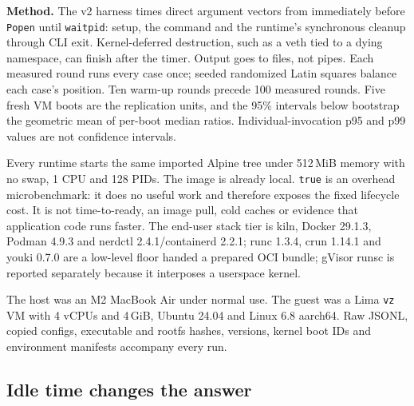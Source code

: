 \documentclass[10pt,letterpaper]{article}
\newcommand{\code}[1]{\texttt{#1}}
\begin{document}
\textbf{Method.} The v2 harness times direct argument vectors from immediately
before \code{Popen} until \code{waitpid}: setup, the command and the runtime's
synchronous cleanup through CLI exit. Kernel-deferred destruction, such as a
veth tied to a dying namespace, can finish after the timer. Output goes to
files, not pipes. Each measured
round runs every case once; seeded randomized Latin squares balance each case's
position. Ten warm-up rounds precede 100 measured rounds. Five fresh VM boots
are the replication units, and the 95\% intervals below bootstrap the geometric
mean of per-boot median ratios. Individual-invocation p95 and p99 values are not
confidence intervals.

Every runtime starts the same imported Alpine tree under 512\,MiB memory with
no swap, 1 CPU and 128 PIDs. The image is already local. \code{true} is an
overhead microbenchmark: it does no useful work and therefore exposes the
fixed lifecycle cost. It is not time-to-ready, an image pull, cold caches or
evidence that application code runs faster. The end-user stack tier is kiln,
Docker 29.1.3, Podman 4.9.3 and nerdctl 2.4.1/containerd 2.2.1; runc 1.3.4,
crun 1.14.1 and youki 0.7.0 are a low-level floor handed a prepared OCI bundle;
gVisor runsc is reported separately because it interposes a userspace kernel.

The host was an M2 MacBook Air under normal use. The guest was a Lima
\code{vz} VM with 4 vCPUs and 4\,GiB, Ubuntu 24.04 and Linux 6.8 aarch64. Raw
JSONL, copied configs, executable and rootfs hashes, versions, kernel boot IDs
and environment manifests accompany every run.

\subsection{Idle time changes the answer}
\end{document}
